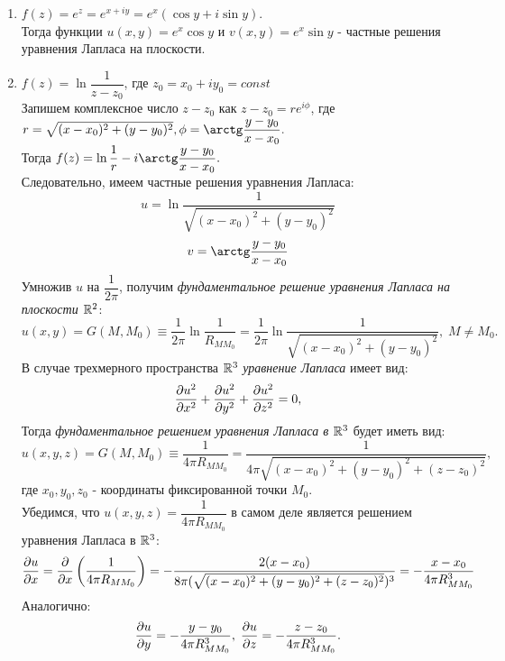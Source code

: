 \documentclass[../main.tex]{subfiles}
\begin{document}
\begin{enumerate}
	\item $f(z) = e^z = e^{x+iy} = e^x(\cos{y}+i\sin{y})$.\\ Тогда функции $u(x,y) = e^x\cos{y}$ и $v(x,y) = e^x\sin{y}$ - частные решения уравнения Лапласа на плоскости.
	\item $f(z) = \ln{\dfrac{1}{z-z_0}}$, где $z_0 = x_0 + iy_0 = const$\\
	      Запишем комплексное число $z-z_0$ как $z-z_0=re^{i\phi}$, где $r = \sqrt{(x-x_0)^2 + (y - y_0)^2},\\\phi = \arctg\dfrac{y-y_0}{x-x_0}.$\\
	      Тогда $f(z) = \ln{\dfrac{1}{r}} - i\arctg\dfrac{y-y_0}{x-x_0}.$\\
	      Следовательно, имеем частные решения уравнения Лапласа:
	      \[
		      u = \ln{\dfrac{1}{\sqrt{(x-x_0)^2 + (y - y_0)^2}}}
	      \]
	      \[
		      v = \arctg\dfrac{y-y_0}{x-x_0}
	      \]
	      Умножив $u$ на $\dfrac{1}{2\pi}$, получим \textit{фундаментальное решение уравнения Лапласа на плоскости $\mathbb{R}^2$}:
	      \begin{equation}
		      u(x, y) = G(M, M_0) \equiv \dfrac{1}{2\pi}\ln{\dfrac{1}{R_{MM_0}}} =  \dfrac{1}{2\pi}\ln{\dfrac{1}{\sqrt{(x-x_0)^2 + (y - y_0)^2}}},\; M \ne M_0.
	      \end{equation}
	      В случае трехмерного пространства $\mathbb{R}^3$ \textit{уравнение Лапласа} имеет вид:
	      \begin{equation}
		      \pderivtwo{u}{x}{x} + \pderivtwo{u}{y}{y} + \pderivtwo{u}{z}{z} = 0,
	      \end{equation}
	      Тогда \textit{фундаментальное решением уравнения Лапласа в $\mathbb{R}^3$} будет иметь вид:
	      \begin{equation}
		      u(x, y, z) = G(M, M_0) \equiv \dfrac{1}{4\pi R_{MM_0}} =  \dfrac{1}{4\pi{\sqrt{(x-x_0)^2 + (y - y_0)^2 + (z - z_0)^2}}},
	      \end{equation}
	      где $x_0, y_0, z_0$ - координаты фиксированной точки $M_0$.\\
	      Убедимся, что $u(x, y, z) = \dfrac{1}{4\pi R_{MM_0}}$ в самом деле является решением уравнения Лапласа в $\mathbb{R}^3$:
	      \[
		      \frac{\partial u}{\partial x} = \frac{\partial}{\partial x}\left(\dfrac{1}{4\pi R_{MM_0}}\right) =  - \dfrac{2(x-x_0)}{{8\pi(\sqrt{(x-x_0)^2 + (y - y_0)^2 + (z - z_0)^2}})^3} = - \dfrac{x-x_0}{4\pi R_{MM_0}^3}
	      \]
	      Аналогично:
	      \[
		      \frac{\partial u}{\partial y} = - \dfrac{y-y_0}{4\pi R_{MM_0}^3},\;
		      \frac{\partial u}{\partial z} = - \dfrac{z-z_0}{4\pi R_{MM_0}^3}.
\]
\end{enumerate}
\end{document}
